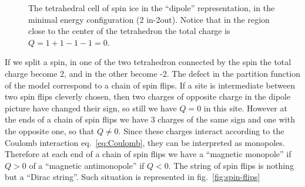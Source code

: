 \documentclass[../main/main.tex]{subfiles}
\begin{document}
\begin{figure}[h]

\caption{The tetrahedral cell of spin ice in the ``dipole'' representation, in the minimal energy configuration (2 in-2out). Notice that in the region close to the center of the tetrahedron the total charge is $Q=1+1-1-1=0$.}
\label{fig:spin-ice-dipole}
\end{figure}

If we split a spin, in one of the two tetrahedron connected by the spin the total charge become 2, and in the other become -2. The defect in the partition function of the model correspond to a chain of spin flips. If a site is intermediate between two spin flips cleverly chosen, then two charges of opposite charge in the dipole picture have changed their sign, so still we have $Q=0$ in this site. However at the ends of a chain of spin flips we have 3 charges of the same sign and one with the opposite one, so that $Q\neq0$. Since these charges interact according to the Coulomb interaction eq.~\eqref{eq:Coulomb}, they can be interpreted as monopoles. Therefore at each end of a chain of spin flips we have a ``magnetic monopole'' if $Q>0$ of a ``magnetic antimonopole'' if $Q<0$. The string of spin flips is nothing but a ``Dirac string''. Such situation is represented in fig.~\ref{fig:spin-flips}
\end{document}
